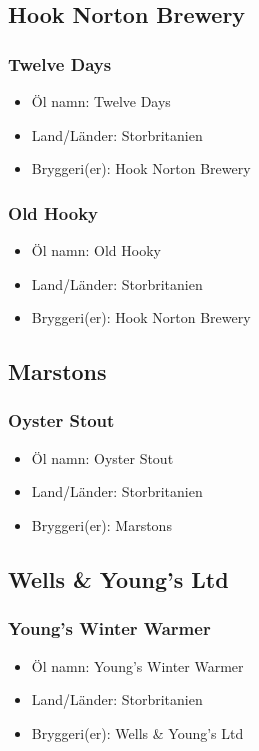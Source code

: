 \documentclass[11pt]{article}
\begin{document}
\subsection{Hook Norton Brewery}
\label{sec:orgf3232ea}
\subsubsection{Twelve Days}
\label{sec:orgf2ba2c9}
\begin{itemize}
\item Öl namn: Twelve Days
\item Land/Länder: Storbritanien
\item Bryggeri(er): Hook Norton Brewery
\end{itemize}
\subsubsection{Old Hooky}
\label{sec:orgb7891c8}
\begin{itemize}
\item Öl namn: Old Hooky
\item Land/Länder: Storbritanien
\item Bryggeri(er): Hook Norton Brewery
\end{itemize}
\subsection{Marstons}
\label{sec:org64be18e}
\subsubsection{Oyster Stout}
\label{sec:org62f0414}
\begin{itemize}
\item Öl namn: Oyster Stout
\item Land/Länder: Storbritanien
\item Bryggeri(er): Marstons
\end{itemize}
\subsection{Wells \& Young's Ltd}
\label{sec:org68103e3}
\subsubsection{Young's Winter Warmer}
\label{sec:org818e23d}
\begin{itemize}
\item Öl namn: Young's Winter Warmer
\item Land/Länder: Storbritanien
\item Bryggeri(er): Wells \& Young's Ltd
\end{itemize}
\end{document}
